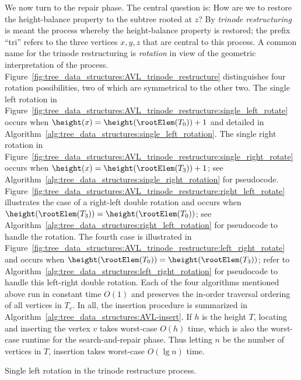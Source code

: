 We now turn to the repair phase. The central question is: How are we
to restore the height-balance property to the subtree rooted at $z$?
By \emph{trinode restructuring} is meant the process whereby the
height-balance property is restored; the prefix ``tri'' refers to the
three vertices $x,y,z$ that are central to this process. A common name
for the trinode restructuring is \emph{rotation} in view of the
geometric interpretation of the process.
Figure~\ref{fig:tree_data_structures:AVL_trinode_restructure}
distinguishes four rotation possibilities, two of which are
symmetrical to the other two. The single left rotation in
Figure~\ref{fig:tree_data_structures:AVL_trinode_restructure:single_left_rotate}
occurs when $\height(x) = \height(\rootElem(T_0)) + 1$ and detailed in
Algorithm~\ref{alg:tree_data_structures:single_left_rotation}. The
single right rotation in
Figure~\ref{fig:tree_data_structures:AVL_trinode_restructure:single_right_rotate}
occurs when $\height(x) = \height(\rootElem(T_3)) + 1$; see
Algorithm~\ref{alg:tree_data_structures:single_right_rotation} for
pseudocode.
Figure~\ref{fig:tree_data_structures:AVL_trinode_restructure:right_left_rotate}
illustrates the case of a right-left double rotation and occurs when
$\height(\rootElem(T_3)) = \height(\rootElem(T_0))$; see
Algorithm~\ref{alg:tree_data_structures:right_left_rotation} for
pseudocode to handle the rotation. The fourth case is illustrated in
Figure~\ref{fig:tree_data_structures:AVL_trinode_restructure:left_right_rotate}
and occurs when $\height(\rootElem(T_0)) = \height(\rootElem(T_3))$;
refer to Algorithm~\ref{alg:tree_data_structures:left_right_rotation}
for pseudocode to handle this left-right double rotation. Each of the
four algorithms mentioned above run in constant time $O(1)$ and
preserves the in-order traversal ordering of all vertices in
$T_v$. In all, the insertion procedure is summarized in
Algorithm~\ref{alg:tree_data_structures:AVL-insert}. If $h$ is the
height $T$, locating and inserting the vertex $v$ takes worst-case
$O(h)$ time, which is also the worst-case runtime for the
search-and-repair phase. Thus letting $n$ be the number of vertices in
$T$, insertion takes worst-case $O(\lg n)$ time.

\begin{algorithm}[!htbp]

\caption{Single left rotation in the trinode restructure process.}
\label{alg:tree_data_structures:single_left_rotation}
\end{algorithm}

